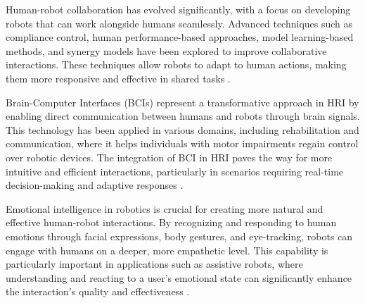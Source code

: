 Human-robot collaboration has evolved significantly, with a focus on developing robots that can work alongside humans seamlessly. Advanced techniques such as compliance control, human performance-based approaches, model learning-based methods, and synergy models have been explored to improve collaborative interactions. These techniques allow robots to adapt to human actions, making them more responsive and effective in shared tasks \cite{safavi2024}.

Brain-Computer Interfaces (BCIs) represent a transformative approach in HRI by enabling direct communication between humans and robots through brain signals. This technology has been applied in various domains, including rehabilitation and communication, where it helps individuals with motor impairments regain control over robotic devices. The integration of BCI in HRI paves the way for more intuitive and efficient interactions, particularly in scenarios requiring real-time decision-making and adaptive responses \cite{safavi2024}.

Emotional intelligence in robotics is crucial for creating more natural and effective human-robot interactions. By recognizing and responding to human emotions through facial expressions, body gestures, and eye-tracking, robots can engage with humans on a deeper, more empathetic level. This capability is particularly important in applications such as assistive robots, where understanding and reacting to a user's emotional state can significantly enhance the interaction's quality and effectiveness \cite{safavi2024}.
